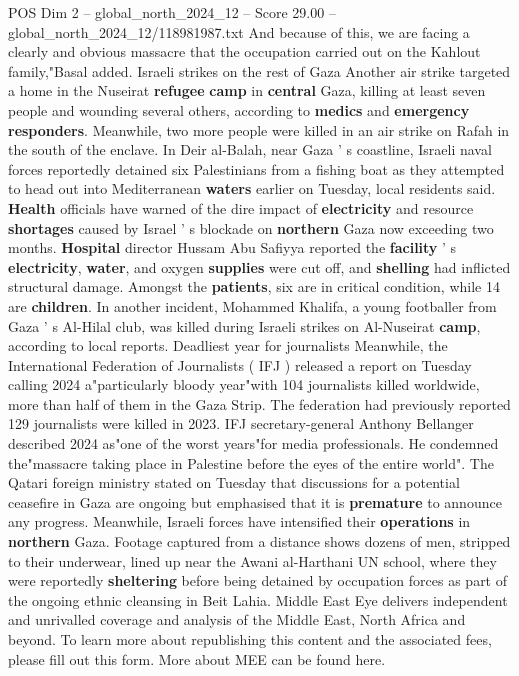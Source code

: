 \begin{textsample}{POS Dim 2 – global\_north\_2024\_12 – Score 29.00 – global\_north\_2024\_12/118981987.txt}
And because of this, we are facing a clearly and obvious massacre that the occupation carried out on the Kahlout family,"Basal added.
Israeli strikes on the rest of Gaza Another air strike targeted a home in the Nuseirat \textbf{refugee} \textbf{camp} in \textbf{central} Gaza, killing at least seven people and wounding several others, according to \textbf{medics} and \textbf{emergency} \textbf{responders}.
Meanwhile, two more people were killed in an air strike on Rafah in the south of the enclave.
In Deir al-Balah, near Gaza ' s coastline, Israeli naval forces reportedly detained six Palestinians from a fishing boat as they attempted to head out into Mediterranean \textbf{waters} earlier on Tuesday, local residents said. \textbf{Health} officials have warned of the dire impact of \textbf{electricity} and resource \textbf{shortages} caused by Israel ' s blockade on \textbf{northern} Gaza now exceeding two months. \textbf{Hospital} director Hussam Abu Safiyya reported the \textbf{facility} ' s \textbf{electricity}, \textbf{water}, and oxygen \textbf{supplies} were cut off, and \textbf{shelling} had inflicted structural damage.
Amongst the \textbf{patients}, six are in critical condition, while 14 are \textbf{children}.
In another incident, Mohammed Khalifa, a young footballer from Gaza ' s Al-Hilal club, was killed during Israeli strikes on Al-Nuseirat \textbf{camp}, according to local reports.
Deadliest year for journalists Meanwhile, the International Federation of Journalists ( IFJ ) released a report on Tuesday calling 2024 a"particularly bloody year"with 104 journalists killed worldwide, more than half of them in the Gaza Strip.
The federation had previously reported 129 journalists were killed in 2023.
IFJ secretary-general Anthony Bellanger described 2024 as"one of the worst years"for media professionals.
He condemned the"massacre taking place in Palestine before the eyes of the entire world".
The Qatari foreign ministry stated on Tuesday that discussions for a potential ceasefire in Gaza are ongoing but emphasised that it is \textbf{premature} to announce any progress.
Meanwhile, Israeli forces have intensified their \textbf{operations} in \textbf{northern} Gaza.
Footage captured from a distance shows dozens of men, stripped to their underwear, lined up near the Awani al-Harthani UN school, where they were reportedly \textbf{sheltering} before being detained by occupation forces as part of the ongoing ethnic cleansing in Beit Lahia.
Middle East Eye delivers independent and unrivalled coverage and analysis of the Middle East, North Africa and beyond.
To learn more about republishing this content and the associated fees, please fill out this form.
More about MEE can be found here.

\end{textsample}

